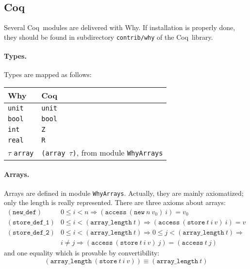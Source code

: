 \documentclass[a4paper,12pt]{report}
\makeatletter
\newcommand{\coq}{\textsf{Coq}\index{Coq@\textsf{Coq}}}
\newcommand{\why}{\textsf{Why}}
\newcommand{\te}[1]{\texttt{#1}}
\makeatother
\begin{document}
\subsection{Coq}
\label{lib:coq}

Several \coq\ modules are delivered with \why. If installation is
properly done, they should be found in subdirectory
\texttt{contrib/why} of the \coq\ library.

\paragraph{Types.} 
Types are mapped as follows:
\begin{center}
  \begin{tabular}{|l|l|}
    \hline
    \why & \coq \\
    \hline
    \texttt{unit} & \texttt{unit} \\
    \hline
    \texttt{bool} & \texttt{bool} \\
    \hline
    \texttt{int} & \texttt{Z} \\
    \hline
    \texttt{real} & \texttt{R} \\
    \hline
    $\tau$ \texttt{array} & \texttt{(array $\tau$)},
                            from module \texttt{WhyArrays} \\
    \hline
  \end{tabular}
\end{center}

\paragraph{Arrays.} 
Arrays are defined in module \texttt{WhyArrays}. Actually, they are
mainly axiomatized; only the length is really represented.
There are three axioms about arrays:
\begin{displaymath}
  \begin{array}{rl}
    (\te{new\_def}) &
    0 \le i < n \Rightarrow (\te{access} ~ (\te{new} ~ n ~ v_0) ~ i) = v_0 
    \\[1em]
    (\te{store\_def\_1}) &
    0 \le i < (\te{array\_length} ~ t) \Rightarrow
                    (\te{access} ~ (\te{store} ~ t ~ i ~ v) ~ i) = v
    \\[1em]
    (\te{store\_def\_2}) &
    0 \le i < (\te{array\_length} ~ t) \Rightarrow
    0 \le j < (\te{array\_length} ~ t) \Rightarrow \\ &
                    i \not= j \Rightarrow
                    (\te{access} ~ (\te{store} ~ t ~ i ~ v) ~ j) =
                    (\te{access} ~ t ~ j)
  \end{array}
\end{displaymath}
and one equality which is provable by convertibility:
\begin{displaymath}
  (\te{array\_length} ~ (\te{store} ~ t ~ i ~ v)) \equiv
  (\te{array\_length} ~ t)
\end{displaymath}
\end{document}
